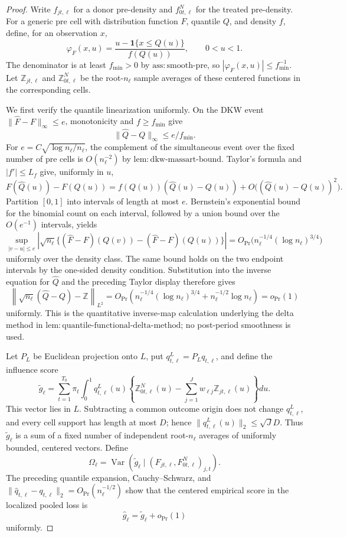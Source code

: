 \documentclass{article}
\begin{document}
\begin{proof}
Write \(f_{jt,\ell}\) for a donor pre-density and \(f^N_{0t,\ell}\) for the treated pre-density.  For a generic pre cell with distribution function \(F\), quantile \(Q\), and density \(f\), define, for an observation \(x\),
\[
 \varphi_{F}(x,u)=
 \frac{u-\mathbf 1\{x\leq Q(u)\}}{f(Q(u))},
 \qquad 0<u<1.
\]
The denominator is at least \(f_{\min}>0\) by \(\mathrm{ass:smooth\mbox{-}pre}\), so \(|\varphi_F(x,u)|\leq f_{\min}^{-1}\).  Let \(\mathbb Z_{jt,\ell}\) and \(\mathbb Z^N_{0t,\ell}\) be the root-\(n_\ell\) sample averages of these centered functions in the corresponding cells.

We first verify the quantile linearization uniformly.  On the DKW event
\(\|\widehat F-F\|_\infty\leq e\), monotonicity and \(f\geq f_{\min}\) give
\[
 \|\widehat Q-Q\|_\infty\leq e/f_{\min}.
\]
For \(e=C\sqrt{\log n_\ell/n_\ell}\), the complement of the simultaneous event over the fixed number of pre cells is \(O(n_\ell^{-2})\) by \(\mathrm{lem:dkw\mbox{-}massart\mbox{-}bound}\).  Taylor's formula and \(|f'|\leq L_f\) give, uniformly in \(u\),
\[
 F(\widehat Q(u))-F(Q(u))
 =f(Q(u))(\widehat Q(u)-Q(u))
 +O\bigl((\widehat Q(u)-Q(u))^2\bigr).
\]
Partition \([0,1]\) into intervals of length at most \(e\).  Bernstein's exponential bound for the binomial count on each interval, followed by a union bound over the \(O(e^{-1})\) intervals, yields
\[
 \sup_{|v-u|\leq e}
 \left|\sqrt{n_\ell}\{(\widehat F-F)(Q(v))
              -(\widehat F-F)(Q(u))\}\right|
 =O_{\Pr}\bigl(n_\ell^{-1/4}(\log n_\ell)^{3/4}\bigr)
\]
uniformly over the density class.  The same bound holds on the two endpoint intervals by the one-sided density condition.  Substitution into the inverse equation for \(\widehat Q\) and the preceding Taylor display therefore gives
\[
 \left\|\sqrt{n_\ell}(\widehat Q-Q)-\mathbb Z\right\|_{L^2}
 =O_{\Pr}\left(n_\ell^{-1/4}(\log n_\ell)^{3/4}
       +n_\ell^{-1/2}\log n_\ell\right)=o_{\Pr}(1)
\]
uniformly.  This is the quantitative inverse-map calculation underlying the delta method in \(\mathrm{lem:quantile\mbox{-}functional\mbox{-}delta\mbox{-}method}\); no post-period smoothness is used.

Let \(P_L\) be Euclidean projection onto \(L\), put
\(q^L_{t,\ell}=P_Lq_{t,\ell}\), and define the influence score
\[
 \widetilde g_\ell=
 \sum_{t=1}^{T_0}\pi_t\int_0^1q^L_{t,\ell}(u)
 \left\{\mathbb Z^N_{0t,\ell}(u)
       -\sum_{j=1}^Jw_{\ell j}\mathbb Z_{jt,\ell}(u)\right\}du.
\]
This vector lies in \(L\).  Subtracting a common outcome origin does not change \(q^L_{t,\ell}\), and every cell support has length at most \(D\); hence
\(\|q^L_{t,\ell}(u)\|_2\leq\sqrt J D\).  Thus \(\widetilde g_\ell\) is a sum of a fixed number of independent root-\(n_\ell\) averages of uniformly bounded, centered vectors.  Define
\[
 \Omega_\ell=\operatorname{Var}(\widetilde g_\ell\mid
  (F_{jt,\ell},F^N_{0t,\ell})_{j,t}).
\]
The preceding quantile expansion, Cauchy--Schwarz, and
\(\|\widehat q_{t,\ell}-q_{t,\ell}\|_2=O_{\Pr}(n_\ell^{-1/2})\) show that the centered empirical score in the localized pooled loss is
\[
 \widehat g_\ell=\widetilde g_\ell+o_{\Pr}(1)
\]
uniformly.


\end{proof}
\end{document}
